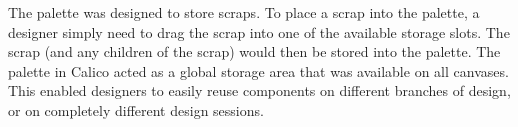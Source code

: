 The palette was designed to store scraps. To place a scrap into the palette, a designer simply need to drag the scrap into one of the available storage slots. The scrap (and any children of the scrap) would then be stored into the palette. The palette in Calico acted as a global storage area that was available on all canvases. This enabled designers to easily reuse components on different branches of design, or on completely different design sessions.  
